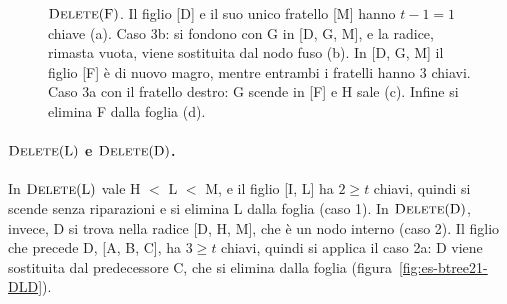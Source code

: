 \begin{figure}[htbp]
\caption{$\textsc{Delete}(\mathrm{F})$. Il figlio [D] e il suo unico fratello [M] hanno $t-1 = 1$ chiave (a). Caso 3b: si fondono con G in [D, G, M], e la radice, rimasta vuota, viene sostituita dal nodo fuso (b). In [D, G, M] il figlio [F] è di nuovo magro, mentre entrambi i fratelli hanno $3$ chiavi. Caso 3a con il fratello destro: G scende in [F] e H sale (c). Infine si elimina F dalla foglia (d).}
\label{fig:es-btree21-DF}
\end{figure}

\paragraph{$\textsc{Delete}(\mathrm{L})$ e $\textsc{Delete}(\mathrm{D})$.}
In $\textsc{Delete}(\mathrm{L})$ vale H $<$ L $<$ M, e il figlio [I, L] ha $2 \ge t$ chiavi, quindi si scende senza riparazioni e si elimina L dalla foglia (caso 1). In $\textsc{Delete}(\mathrm{D})$, invece, D si trova nella radice [D, H, M], che è un nodo interno (caso 2). Il figlio che precede D, [A, B, C], ha $3 \ge t$ chiavi, quindi si applica il caso 2a: D viene sostituita dal predecessore C, che si elimina dalla foglia (figura~\ref{fig:es-btree21-DLD}).

